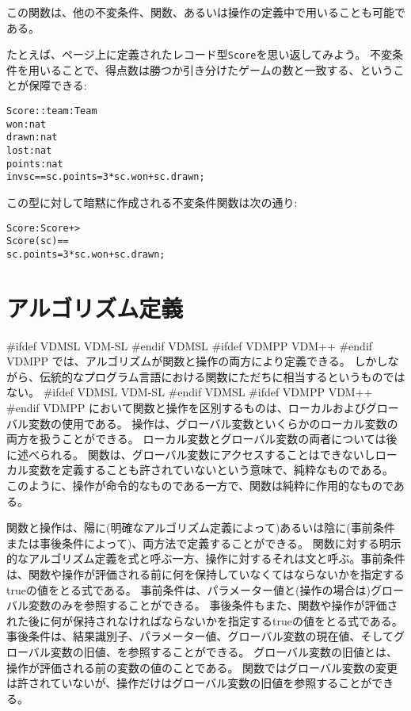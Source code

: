 \documentclass[\pformat,12pt]{jarticle}
\newcommand{\vdmslpp}[2]{%
#ifdef VDMSL
#1
#endif VDMSL
#ifdef VDMPP
#2
#endif VDMPP
}
\newcommand{\vdmsl}{VDM-SL}
\newcommand{\vdmpp}{VDM++}
\begin{document}
この関数は、他の不変条件、関数、あるいは操作の定義中で用いることも可能である。

たとえば、\pageref{scoredef}ページ上に定義されたレコード型\texttt{Score}を思い返してみよう。
不変条件を用いることで、得点数は勝つか引き分けたゲームの数と一致する、ということが保障できる:
\begin{alltt}
  Score :: team : Team
           won : nat
           drawn : nat
           lost : nat
           points : nat
  inv sc == sc.points = 3 * sc.won + sc.drawn;
\end{alltt}
この型に対して暗黙に作成される不変条件関数は次の通り:
\begin{alltt}
  Score : Score +> 
  Score (sc) == 
    sc.points = 3 * sc.won + sc.drawn;
\end{alltt}

\section{アルゴリズム定義}
\label{algorithm}


\vdmslpp{\vdmsl}{\vdmpp}では、アルゴリズムが関数と操作の両方により定義できる。 
しかしながら、伝統的なプログラム言語における関数にただちに相当するというものではない。
\vdmslpp{\vdmsl}{\vdmpp}において関数と操作を区別するものは、ローカルおよびグローバル変数の使用である。
操作は、グローバル変数といくらかのローカル変数の両方を扱うことができる。
ローカル変数とグローバル変数の両者については後に述べられる。
関数は、グローバル変数にアクセスすることはできないしローカル変数を定義することも許されていないという意味で、純粋なものである。
このように、操作が命令的なものである一方で、関数は純粋に作用的なものである。

関数と操作は、陽に(明確なアルゴリズム定義によって)あるいは陰に(事前条件または事後条件によって)、両方法で定義することができる。
関数に対する明示的なアルゴリズム定義を式と呼ぶ一方、操作に対するそれは文と呼ぶ。事前条件は、関数や操作が評価される前に何を保持していなくてはならないかを指定するtrueの値をとる式である。
事前条件は、パラメーター値と(操作の場合は)グローバル変数のみを参照することができる。
事後条件もまた、関数や操作が評価された後に何が保持されなければならないかを指定するtrueの値をとる式である。
事後条件は、結果識別子、パラメーター値、グローバル変数の現在値、そしてグローバル変数の旧値、を参照することができる。
グローバル変数の旧値とは、操作が評価される前の変数の値のことである。
関数ではグローバル変数の変更は許されていないが、操作だけはグローバル変数の旧値を参照することができる。
\end{document}
